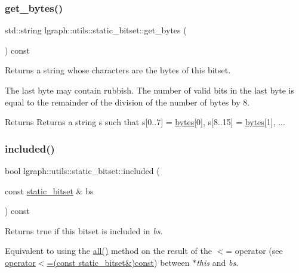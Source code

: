 \subsubsection{\texorpdfstring{get\+\_\+bytes()}{get\_bytes()}\hspace{0.1cm}{\footnotesize\ttfamily [2/2]}}
{\footnotesize\ttfamily std\+::string lgraph\+::utils\+::static\+\_\+bitset\+::get\+\_\+bytes (\begin{DoxyParamCaption}{ }\end{DoxyParamCaption}) const}



Returns a string whose characters are the bytes of this bitset. 

The last byte may contain rubbish. The number of valid bits in the last byte is equal to the remainder of the division of the number of bytes by 8.

\begin{DoxyReturn}{Returns}
Returns a string \textquotesingle{}s\textquotesingle{} such that s\mbox{[}0..7\mbox{]} = \hyperlink{classlgraph_1_1utils_1_1static__bitset_a56d277fc22bbf71a27fca530a133c9bd}{bytes}\mbox{[}0\mbox{]}, s\mbox{[}8..15\mbox{]} = \hyperlink{classlgraph_1_1utils_1_1static__bitset_a56d277fc22bbf71a27fca530a133c9bd}{bytes}\mbox{[}1\mbox{]}, ... 
\end{DoxyReturn}
\mbox{\label{classlgraph_1_1utils_1_1static__bitset_a28690f7e3bb35b839a80fbb2bcd66389}} 
\subsubsection{\texorpdfstring{included()}{included()}}
{\footnotesize\ttfamily bool lgraph\+::utils\+::static\+\_\+bitset\+::included (\begin{DoxyParamCaption}\item[{const \hyperlink{classlgraph_1_1utils_1_1static__bitset}{static\+\_\+bitset} \&}]{bs }\end{DoxyParamCaption}) const}



Returns true if this bitset is included in {\itshape bs}. 

Equivalent to using the \hyperlink{classlgraph_1_1utils_1_1static__bitset_a6092b3d92a70408db6cf67348277eedc}{all()} method on the result of the \textquotesingle{}$<$=\textquotesingle{} operator (see \hyperlink{classlgraph_1_1utils_1_1static__bitset_a633df0acba7afd646bbbef1acd85ca49}{operator$<$=(const static\+\_\+bitset\&)const}) between {\itshape $\ast$this} and {\itshape bs}.


